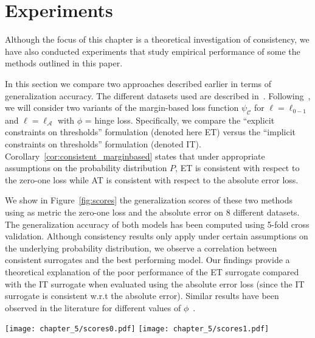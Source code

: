 \section{Experiments}\label{sec:experiments}

Although the focus of this chapter is a theoretical investigation of consistency, we have also conducted experiments that study empirical performance of some the methods outlined in this paper. 


In this section we compare two approaches described earlier in terms of generalization accuracy. The different datasets used are described in~\citep{Chu2005a}. Following~\citep{Keerthi2003}, we will consider two variants of the margin-based loss function $\psi_{\mathcal{C}}$ for $\ell = \ell_{0-1}$ and $\ell=\ell_{\mathcal{A}}$ with $\phi$ = hinge loss. Specifically, we compare the ``explicit constraints on thresholds'' formulation (denoted here ET) versus the ``implicit constraints on thresholds'' formulation (denoted IT). Corollary~\ref{cor:consistent_marginbased} states that under appropriate assumptions on the probability distribution $P$, ET is consistent with respect to the zero-one loss while AT is consistent with respect to the absolute error loss.


We show in Figure~\ref{fig:scores} the generalization scores of these two methods using as metric the zero-one loss and the absolute error on 8 different datasets. The generalization accuracy of both models has been computed using 5-fold cross validation. Although consistency results only apply under certain assumptions on the underlying probability distribution, we observe a correlation between consistent surrogates and the best performing model. Our findings provide a theoretical explanation of the poor performance of the ET surrogate compared with the IT surrogate when evaluated using the absolute error loss (since the IT surrogate is consistent w.r.t the absolute error). Similar results have been observed in the literature for different values of $\phi$~\citep{Keerthi2003,lin2006large,Shashua}. 

\begin{figure*}[t]
\texttt{[image: chapter\_5/scores0.pdf]}
\texttt{[image: chapter\_5/scores1.pdf]}
\caption{
Performance of the ``Explicit Threshold'' (ET) and ``Implicit Threshold'' (IT) methods of~\citet{Keerthi2003} on 8 different datasets and for two different evaluation metrics. Top: the metric used is the mean absolute error. The IT method is consistent with respect to this loss and performs better on 7 out of 8 datasets. Bottom: the metric used is the mean zero-one loss. The ET method is consistent with respect to this metric and performs better on 6 out of 8 datasets. Datasets for which the difference of performance is significant (Wilcoxon signed-rank test with $p < 0.01$) are denoted with an asterisk ($*$).
}\label{fig:scores}
\end{figure*}

